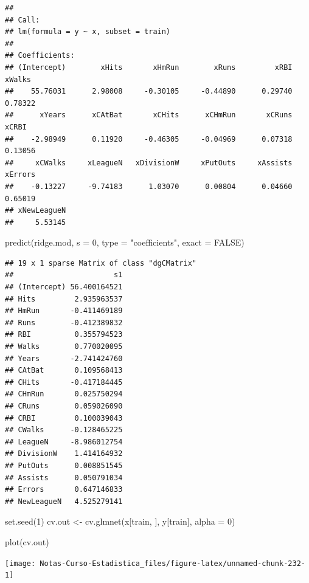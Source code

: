 \documentclass[
  12pt,
]{book}
\newenvironment{Shaded}{\begin{snugshade}}{\end{snugshade}}
\newcommand{\AttributeTok}[1]{\textcolor[rgb]{0.77,0.63,0.00}{#1}}
\newcommand{\ConstantTok}[1]{\textcolor[rgb]{0.00,0.00,0.00}{#1}}
\newcommand{\DecValTok}[1]{\textcolor[rgb]{0.00,0.00,0.81}{#1}}
\newcommand{\FunctionTok}[1]{\textcolor[rgb]{0.00,0.00,0.00}{#1}}
\newcommand{\NormalTok}[1]{#1}
\newcommand{\OtherTok}[1]{\textcolor[rgb]{0.56,0.35,0.01}{#1}}
\newcommand{\StringTok}[1]{\textcolor[rgb]{0.31,0.60,0.02}{#1}}
\begin{document}
\begin{verbatim}
## 
## Call:
## lm(formula = y ~ x, subset = train)
## 
## Coefficients:
## (Intercept)        xHits       xHmRun        xRuns         xRBI       xWalks  
##    55.76031      2.98008     -0.30105     -0.44890      0.29740      0.78322  
##      xYears      xCAtBat       xCHits      xCHmRun       xCRuns        xCRBI  
##    -2.98949      0.11920     -0.46305     -0.04969      0.07318      0.13056  
##     xCWalks     xLeagueN   xDivisionW     xPutOuts     xAssists      xErrors  
##    -0.13227     -9.74183      1.03070      0.00804      0.04660      0.65019  
## xNewLeagueN  
##     5.53145
\end{verbatim}

\begin{Shaded}
\begin{Highlighting}[]
\FunctionTok{predict}\NormalTok{(ridge.mod, }\AttributeTok{s =} \DecValTok{0}\NormalTok{, }\AttributeTok{type =} \StringTok{"coefficients"}\NormalTok{, }\AttributeTok{exact =} \ConstantTok{FALSE}\NormalTok{)}
\end{Highlighting}
\end{Shaded}

\begin{verbatim}
## 19 x 1 sparse Matrix of class "dgCMatrix"
##                       s1
## (Intercept) 56.400164521
## Hits         2.935963537
## HmRun       -0.411469189
## Runs        -0.412389832
## RBI          0.355794523
## Walks        0.770020095
## Years       -2.741424760
## CAtBat       0.109568413
## CHits       -0.417184445
## CHmRun       0.025750294
## CRuns        0.059026090
## CRBI         0.100039043
## CWalks      -0.128465225
## LeagueN     -8.986012754
## DivisionW    1.414164932
## PutOuts      0.008851545
## Assists      0.050791034
## Errors       0.647146833
## NewLeagueN   4.525279141
\end{verbatim}

\begin{Shaded}
\begin{Highlighting}[]
\FunctionTok{set.seed}\NormalTok{(}\DecValTok{1}\NormalTok{)}
\NormalTok{cv.out }\OtherTok{\textless{}{-}} \FunctionTok{cv.glmnet}\NormalTok{(x[train, ], y[train], }\AttributeTok{alpha =} \DecValTok{0}\NormalTok{)}

\FunctionTok{plot}\NormalTok{(cv.out)}
\end{Highlighting}
\end{Shaded}

\begin{center}\texttt{[image: Notas-Curso-Estadistica\_files/figure-latex/unnamed-chunk-232-1]} \end{center}
\end{document}

